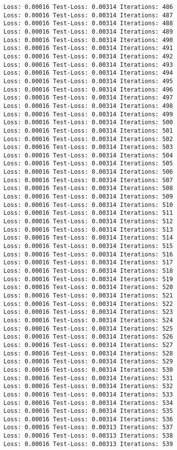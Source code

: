 \documentclass[11pt]{article}
\begin{document}
\begin{Verbatim}[commandchars=\\\{\}]
Loss: 0.00016 Test-Loss: 0.00314 Iterations: 486
Loss: 0.00016 Test-Loss: 0.00314 Iterations: 487
Loss: 0.00016 Test-Loss: 0.00314 Iterations: 488
Loss: 0.00016 Test-Loss: 0.00314 Iterations: 489
Loss: 0.00016 Test-Loss: 0.00314 Iterations: 490
Loss: 0.00016 Test-Loss: 0.00314 Iterations: 491
Loss: 0.00016 Test-Loss: 0.00314 Iterations: 492
Loss: 0.00016 Test-Loss: 0.00314 Iterations: 493
Loss: 0.00016 Test-Loss: 0.00314 Iterations: 494
Loss: 0.00016 Test-Loss: 0.00314 Iterations: 495
Loss: 0.00016 Test-Loss: 0.00314 Iterations: 496
Loss: 0.00016 Test-Loss: 0.00314 Iterations: 497
Loss: 0.00016 Test-Loss: 0.00314 Iterations: 498
Loss: 0.00016 Test-Loss: 0.00314 Iterations: 499
Loss: 0.00016 Test-Loss: 0.00314 Iterations: 500
Loss: 0.00016 Test-Loss: 0.00314 Iterations: 501
Loss: 0.00016 Test-Loss: 0.00314 Iterations: 502
Loss: 0.00016 Test-Loss: 0.00314 Iterations: 503
Loss: 0.00016 Test-Loss: 0.00314 Iterations: 504
Loss: 0.00016 Test-Loss: 0.00314 Iterations: 505
Loss: 0.00016 Test-Loss: 0.00314 Iterations: 506
Loss: 0.00016 Test-Loss: 0.00314 Iterations: 507
Loss: 0.00016 Test-Loss: 0.00314 Iterations: 508
Loss: 0.00016 Test-Loss: 0.00314 Iterations: 509
Loss: 0.00016 Test-Loss: 0.00314 Iterations: 510
Loss: 0.00016 Test-Loss: 0.00314 Iterations: 511
Loss: 0.00016 Test-Loss: 0.00314 Iterations: 512
Loss: 0.00016 Test-Loss: 0.00314 Iterations: 513
Loss: 0.00016 Test-Loss: 0.00314 Iterations: 514
Loss: 0.00016 Test-Loss: 0.00314 Iterations: 515
Loss: 0.00016 Test-Loss: 0.00314 Iterations: 516
Loss: 0.00016 Test-Loss: 0.00314 Iterations: 517
Loss: 0.00016 Test-Loss: 0.00314 Iterations: 518
Loss: 0.00016 Test-Loss: 0.00314 Iterations: 519
Loss: 0.00016 Test-Loss: 0.00314 Iterations: 520
Loss: 0.00016 Test-Loss: 0.00314 Iterations: 521
Loss: 0.00016 Test-Loss: 0.00314 Iterations: 522
Loss: 0.00016 Test-Loss: 0.00314 Iterations: 523
Loss: 0.00016 Test-Loss: 0.00314 Iterations: 524
Loss: 0.00016 Test-Loss: 0.00314 Iterations: 525
Loss: 0.00016 Test-Loss: 0.00314 Iterations: 526
Loss: 0.00016 Test-Loss: 0.00314 Iterations: 527
Loss: 0.00016 Test-Loss: 0.00314 Iterations: 528
Loss: 0.00016 Test-Loss: 0.00314 Iterations: 529
Loss: 0.00016 Test-Loss: 0.00314 Iterations: 530
Loss: 0.00016 Test-Loss: 0.00314 Iterations: 531
Loss: 0.00016 Test-Loss: 0.00314 Iterations: 532
Loss: 0.00016 Test-Loss: 0.00314 Iterations: 533
Loss: 0.00016 Test-Loss: 0.00314 Iterations: 534
Loss: 0.00016 Test-Loss: 0.00314 Iterations: 535
Loss: 0.00016 Test-Loss: 0.00314 Iterations: 536
Loss: 0.00016 Test-Loss: 0.00313 Iterations: 537
Loss: 0.00016 Test-Loss: 0.00313 Iterations: 538
Loss: 0.00016 Test-Loss: 0.00313 Iterations: 539

\end{Verbatim}
\end{document}
